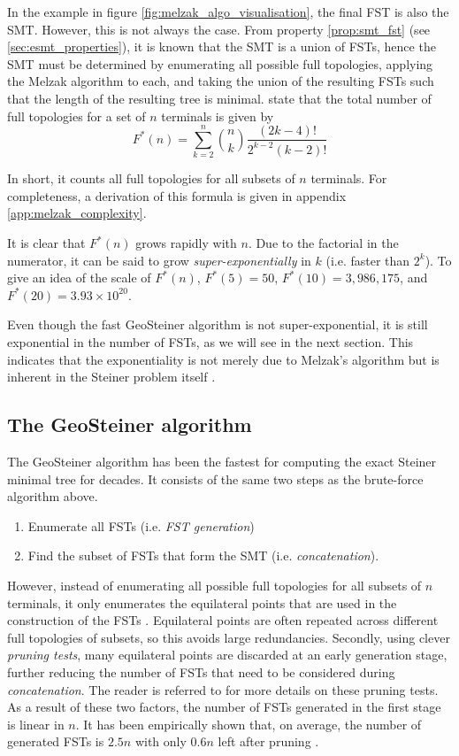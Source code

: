 \documentclass{l4proj}
\begin{document}
In the example in figure \ref{fig:melzak_algo_visualisation}, the final FST is also the SMT. However, this is not always the case. From property \ref{prop:smt_fst} (see \ref{sec:esmt_properties}), it is known that the SMT is a union of FSTs, hence the SMT must be determined by enumerating all possible full topologies, applying the Melzak algorithm to each, and taking the union of the resulting FSTs such that the length of the resulting tree is minimal. \cite{geosteiner96} state that the total number of full topologies for a set of $n$ terminals is given by
$$
    F^*(n) = \sum_{k=2}^{n} \binom{n}{k}\frac{(2k - 4)!}{2^{k-2}(k-2)!}
$$

In short, it counts all full topologies for all subsets of $n$ terminals.
For completeness, a derivation of this formula is given in appendix \ref{app:melzak_complexity}.

It is clear that $F^*(n)$ grows rapidly with $n$. Due to the factorial in the numerator, it can be said to grow \textit{super-exponentially} in $k$ (i.e. faster than $2^k$). To give an idea of the scale of $F^*(n)$, $F^*(5) = 50$, $F^*(10) = 3,986,175$, and $F^*(20) = 3.93 \times 10^{20}$.

Even though the fast GeoSteiner algorithm is not super-exponential, it is still exponential in the number of FSTs, as we will see in the next section. This indicates that the exponentiality is not merely due to Melzak's algorithm but is inherent in the Steiner problem itself \citep{Steiner_tree_problems_hwang}.

\subsection{The GeoSteiner algorithm}
The GeoSteiner algorithm has been the fastest for computing the exact Steiner minimal tree for decades.
It consists of the same two steps as the brute-force algorithm above.
\begin{enumerate}
    \item Enumerate all FSTs (i.e. \textit{FST generation})
    \item Find the subset of FSTs that form the SMT (i.e. \textit{concatenation}).
\end{enumerate}
However, instead of enumerating all possible full topologies for all subsets of $n$ terminals, it only enumerates the equilateral points that are used in the construction of the FSTs \citep{geosteiner96}. Equilateral points are often repeated across different full topologies of subsets, so this avoids large redundancies. Secondly, using clever \textit{pruning tests}, many equilateral points are discarded at an early generation stage, further reducing the number of FSTs that need to be considered during \textit{concatenation}. The reader is referred to \cite{geosteiner96} for more details on these pruning tests.
As a result of these two factors, the number of FSTs generated in the first stage is linear in $n$. It has been empirically shown that, on average, the number of generated FSTs is $2.5n$ with only $0.6n$ left after pruning \citep{29ee725d11ac4584b72f7fe66c4326fa}.
\end{document}
